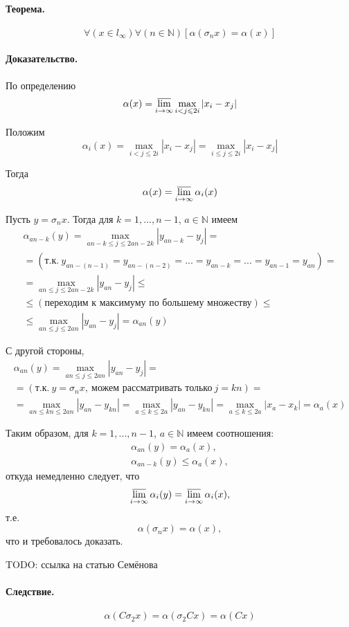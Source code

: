 \paragraph{Теорема.}
$$
	\forall(x\in l_\infty) \forall(n\in\mathbb{N})
	[
		\alpha(\sigma_n x) = \alpha(x)
	]
$$

\paragraph{Доказательство.}
По определению
\begin{equation}
	\alpha(x) = \varlimsup_{i\to\infty} \max_{i<j\leqslant 2i} |x_i - x_j|
\end{equation}

Положим
\begin{equation}
	\alpha_i(x) =
	\max_{i<j\leqslant 2i} |x_i - x_j| =
	\max_{i\leqslant j\leqslant 2i} |x_i - x_j|
\end{equation}

Тогда
\begin{equation}
	\alpha(x) = \varlimsup_{i\to\infty} \alpha_i(x)
\end{equation}

Пусть $y = \sigma_n x$.
Тогда для $k=1, ..., n-1$, $a\in\mathbb{N}$ имеем
\begin{multline}
	\alpha_{an-k}(y) =
	\max_{an-k \leqslant j \leqslant 2an-2k} |y_{an-k} - y_j| =
	\\=
	(\mbox{т.к.}~y_{an-(n-1)}=y_{an-(n-2)}=...=y_{an-k}=...=y_{an-1}=y_{an})=
	\\=
	\max_{an \leqslant j \leqslant 2an-2k} |y_{an} - y_j| \leqslant
	\\ \leqslant
	(\mbox{переходим к максимуму по большему множеству}) \leqslant
	\\ \leqslant
	\max_{an \leqslant j \leqslant 2an} |y_{an} - y_j| =
	\alpha_{an}(y)
\end{multline}

С другой стороны,
\begin{multline}
	\alpha_{an}(y) =
	\max_{an \leqslant j \leqslant 2an} |y_{an} - y_j| =
	\\ =
	(\mbox{т.к.}~y=\sigma_n x,~\mbox{можем рассматривать только}~j=kn)=
	\\ =
	\max_{an \leqslant kn \leqslant 2an} |y_{an} - y_{kn}| =
	\max_{a \leqslant k \leqslant 2a} |y_{an} - y_{kn}| =
	\max_{a \leqslant k \leqslant 2a} |x_a - x_k| =
	\alpha_a(x)
\end{multline}

Таким образом, для $k=1, ..., n-1$, $a\in\mathbb{N}$ имеем соотношения:
\begin{gather}
	\alpha_{an}(y) = \alpha_a(x),
\\
	\alpha_{an-k}(y) \leqslant \alpha_a(x),
\end{gather}
откуда немедленно следует, что
\begin{equation}
	\varlimsup_{i\to\infty} \alpha_i(y) =
	\varlimsup_{i\to\infty} \alpha_i(x),
\end{equation}
т.е.
\begin{equation}
	\alpha(\sigma_n x) = \alpha(x),
\end{equation}
что и требовалось доказать.

TODO: ссылка на статью Семёнова

\paragraph{Следствие.}
$$
	\alpha(C\sigma_2 x) =
	\alpha(\sigma_2 Cx) =
	\alpha(Cx)
$$
